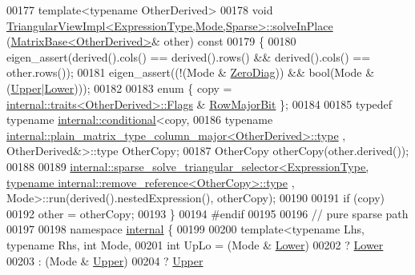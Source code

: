 \begin{DoxyCode}
00177 \textcolor{keyword}{template}<\textcolor{keyword}{typename} OtherDerived>
00178 \textcolor{keywordtype}{void} \hyperlink{class_eigen_1_1_triangular_view_impl}{TriangularViewImpl<ExpressionType,Mode,Sparse>::solveInPlace}
      (\hyperlink{group___core___module_class_eigen_1_1_matrix_base}{MatrixBase<OtherDerived>}& other)\textcolor{keyword}{ const}
00179 \textcolor{keyword}{}\{
00180   eigen\_assert(derived().cols() == derived().rows() && derived().cols() == other.rows());
00181   eigen\_assert((!(Mode & \hyperlink{group__enums_gga39e3366ff5554d731e7dc8bb642f83cda884ff7240392e85aa6e4b3c957e36483}{ZeroDiag})) && \textcolor{keywordtype}{bool}(Mode & (\hyperlink{group__enums_gga39e3366ff5554d731e7dc8bb642f83cda6bcb58be3b8b8ec84859ce0c5ac0aaec}{Upper}|\hyperlink{group__enums_gga39e3366ff5554d731e7dc8bb642f83cda891792b8ed394f7607ab16dd716f60e6}{Lower})));
00182 
00183   \textcolor{keyword}{enum} \{ copy = \hyperlink{struct_eigen_1_1internal_1_1traits}{internal::traits<OtherDerived>::Flags} & 
      \hyperlink{group__flags_gae4f56c2a60bbe4bd2e44c5b19cbe8762}{RowMajorBit} \};
00184 
00185   \textcolor{keyword}{typedef} \textcolor{keyword}{typename} \hyperlink{struct_eigen_1_1internal_1_1conditional}{internal::conditional}<copy,
00186     \textcolor{keyword}{typename} \hyperlink{group___core___module_class_eigen_1_1_matrix}{internal::plain\_matrix\_type\_column\_major<OtherDerived>::type}
      , OtherDerived&>::type OtherCopy;
00187   OtherCopy otherCopy(other.derived());
00188 
00189   
      \hyperlink{struct_eigen_1_1internal_1_1sparse__solve__triangular__selector}{internal::sparse\_solve\_triangular\_selector<ExpressionType, typename
       internal::remove\_reference<OtherCopy>::type}
      , Mode>::run(derived().nestedExpression(), otherCopy);
00190 
00191   \textcolor{keywordflow}{if} (copy)
00192     other = otherCopy;
00193 \}
00194 \textcolor{preprocessor}{#endif}
00195 
00196 \textcolor{comment}{// pure sparse path}
00197 
00198 \textcolor{keyword}{namespace }\hyperlink{namespaceinternal}{internal} \{
00199 
00200 \textcolor{keyword}{template}<\textcolor{keyword}{typename} Lhs, \textcolor{keyword}{typename} Rhs, \textcolor{keywordtype}{int} Mode,
00201   \textcolor{keywordtype}{int} UpLo = (Mode & \hyperlink{group__enums_gga39e3366ff5554d731e7dc8bb642f83cda891792b8ed394f7607ab16dd716f60e6}{Lower})
00202            ? \hyperlink{group__enums_gga39e3366ff5554d731e7dc8bb642f83cda891792b8ed394f7607ab16dd716f60e6}{Lower}
00203            : (Mode & \hyperlink{group__enums_gga39e3366ff5554d731e7dc8bb642f83cda6bcb58be3b8b8ec84859ce0c5ac0aaec}{Upper})
00204            ? \hyperlink{group__enums_gga39e3366ff5554d731e7dc8bb642f83cda6bcb58be3b8b8ec84859ce0c5ac0aaec}{Upper}

\end{DoxyCode}
